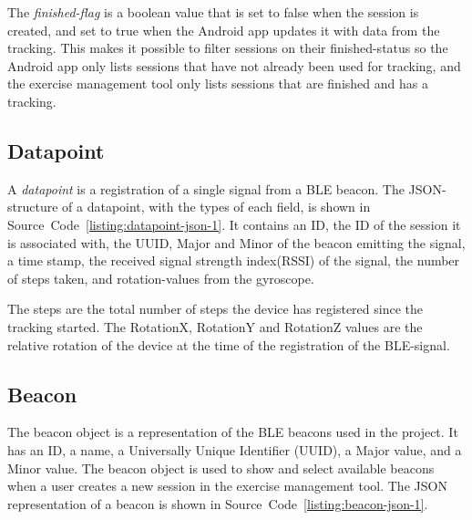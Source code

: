 \documentclass[../Main/thesis.tex]{subfiles}
\begin{document}
The \textit{finished-flag} is a boolean value that is set to false when the session is created, and set to true when the Android app updates it with data from the tracking.
This makes it possible to filter sessions on their finished-status so the Android app only lists sessions that have not already been used for tracking, and the exercise management tool only lists sessions that are finished and has a tracking.

\subsection{Datapoint}
A \textit{datapoint} is a registration of a single signal from a BLE beacon.
The JSON-structure of a datapoint, with the types of each field, is shown in Source~Code~\ref{listing:datapoint-json-1}.
It contains an ID, the ID of the session it is associated with, the UUID, Major and Minor of the beacon emitting the signal, a time stamp, the received signal strength index(RSSI) of the signal, the number of steps taken, and rotation-values from the gyroscope.


The steps are the total number of steps the device has registered since the tracking started. 
The RotationX, RotationY and RotationZ values are the relative rotation of the device at the time of the registration of the BLE-signal.

\subsection{Beacon}
The beacon object is a representation of the BLE beacons used in the project.
It has an ID, a name, a Universally Unique Identifier (UUID), a Major value, and a Minor value.
The beacon object is used to show and select available beacons when a user creates a new session in the exercise management tool.
The JSON representation of a beacon is shown in Source~Code~\ref{listing:beacon-json-1}.
\end{document}
